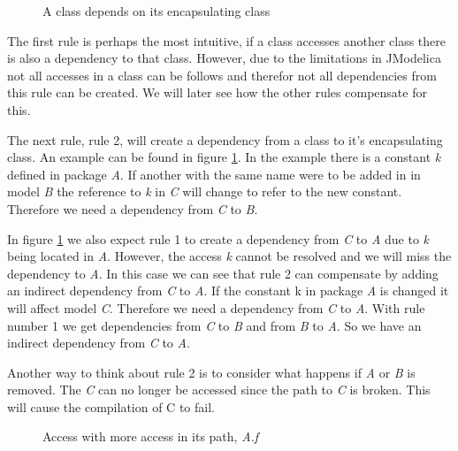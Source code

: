 \documentclass{cslthse-msc}
\begin{document}
\begin{figure}[!htbp]
    \centering
    \qquad
    \subfloat{\raisebox{3.2 cm}{}}
    \caption{A class depends on its encapsulating class}
    \label{fig:parentGraph}
\end{figure}

The first rule is perhaps the most intuitive, if a class accesses another class there is also a dependency to that class. However, due to the limitations in JModelica not all accesses in a class can be follows and therefor not all dependencies from this rule can be created. We will later see how the other rules compensate for this. 

The next rule, rule 2, will create a dependency from a class to it's encapsulating class. An example can be found in figure \ref{fig:parentGraph}. In the example there is a constant \textit{k} defined in package \textit{A}. If another with the same name were to be added in in model \textit{B} the reference to \textit{k} in \textit{C} will change to refer to the new constant. Therefore we need a dependency from \textit{C} to \textit{B}.

In figure \ref{fig:parentGraph} we also expect rule 1 to create a dependency from \textit{C} to \textit{A} due to \textit{k} being located in \textit{A}. However, the access \textit{k} cannot be resolved and we will miss the dependency to \textit{A}. In this case we can see that rule 2 can compensate by adding an indirect dependency from \textit{C} to \textit{A}. 
If the constant k in package \textit{A} is changed it will affect model \textit{C}. Therefore we need a dependency from \textit{C} to \textit{A}. With rule number 1 we get dependencies from \textit{C} to \textit{B} and from \textit{B} to \textit{A}. So we have an indirect dependency from \textit{C} to \textit{A}.

Another way to think about rule 2 is to consider what happens if \textit{A} or \textit{B} is removed. The \textit{C} can no longer be accessed since the path to \textit{C} is broken. This will cause the compilation of C to fail.

\begin{figure}[!htbp]
    \centering
    \qquad
    \caption{Access with more access in its path, \textit{A.f}}
    \label{fig:dotAccess}
\end{figure}
\end{document}
